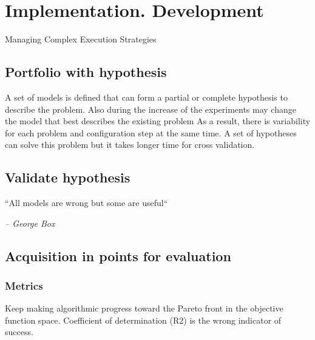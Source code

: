 \chapter{Implementation. Development}
Managing Complex Execution Strategies

\section{Portfolio with hypothesis}
A set of models is defined that can form a partial or complete hypothesis to describe the problem.
Also during the increase of the experiments may change the model that best describes the existing problem
As a result, there is variability for each problem and configuration step at the same time. 
A set of hypotheses can solve this problem but it takes longer time for cross validation.

\section{Validate hypothesis}
    \epigraph{``All models are wrong but some are useful``}{\textit{– George Box}}

\section{Acquisition in points for evaluation}

    \subsection{Metrics}

    Keep making algorithmic progress toward the Pareto front in the objective function space.
    Coefficient of determination (R2) is the wrong indicator of success.

